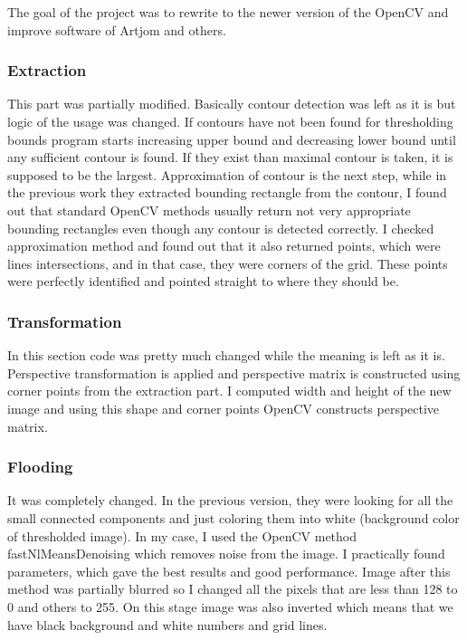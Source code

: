 \documentclass[../../main.tex]{subfiles}
\begin{document}

The goal of the project was to rewrite to the newer version of the OpenCV and improve software of Artjom and others. 

\subsubsection{Extraction}

This part was partially modified. Basically contour detection was left as it is but logic of the usage was changed. If contours have not been found for thresholding bounds program starts increasing upper bound and decreasing lower bound until any sufficient contour is found. If they exist than maximal contour is taken, it is supposed to be the largest. Approximation of contour is the next step, while in the previous work they extracted bounding rectangle from the contour, I found out that standard OpenCV methods usually return not very appropriate bounding rectangles even though any contour is detected correctly. I checked approximation method and found out that it also returned points, which were lines intersections, and in that case, they were corners of the grid. These points were perfectly identified and pointed straight to where they should be.

\subsubsection{Transformation}

In this section code was pretty much changed while the meaning is left as it is. Perspective transformation is applied and perspective matrix is constructed using corner points from the extraction part. I computed width and height of the new image and using this shape and corner points OpenCV constructs perspective matrix.

\subsubsection{Flooding}

It was completely changed. In the previous version, they were looking for all the small connected components and just coloring them into white (background color of thresholded image). In my case, I used the OpenCV method fastNlMeansDenoising which removes noise from the image. I practically found parameters, which gave the best results and good performance. Image after this method was partially blurred so I changed all the pixels that are less than 128 to 0 and others to 255. On this stage image was also inverted which means that we have black background and white numbers and grid lines.
\end{document}
